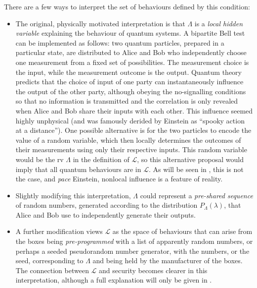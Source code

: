 \documentclass[10pt, a4paper]{article}
\numberwithin{equation}{section} %
\theoremstyle{definition}
\theoremstyle{plain}
\newcommand{\?}{\mathrel{?}} %
\newcommand{\Ls}{\mathcal{L}}
\begin{document}
    There are a few ways to interpret the set of behaviours defined by this condition:
    \begin{itemize}
      \item The original, physically motivated interpretation is that \(\Lambda\) is a \emph{local hidden variable} explaining the behaviour of quantum systems. A bipartite Bell test can be implemented as follows: two quantum particles, prepared in a particular state, are distributed to Alice and Bob who independently choose one measurement from a fixed set of possibilities. The measurement choice is the input, while the measurement outcome is the output. Quantum theory predicts that the choice of input of one party can instantaneously influence the output of the other party, although obeying the no-signalling conditions so that no information is transmitted and the correlation is only revealed when Alice and Bob share their inputs with each other. This influence seemed highly unphysical (and was famously derided by Einstein as ``spooky action at a distance''). One possible alternative is for the two particles to encode the value of a random variable, which then locally determines the outcomes of their measurements using only their respective inputs. This random variable would be the rv \(\Lambda\) in the definition of \(\Ls\), so this alternative proposal would imply that all quantum behaviours are in \(\Ls\). As will be seen in , this is not the case, and \emph{pace} Einstein, nonlocal influence is a feature of reality.
      \item Slightly modifying this interpretation, \(\Lambda\) could represent a \emph{pre-shared sequence} of random numbers, generated according to the distribution \(P_{\Lambda}(\lambda)\), that Alice and Bob use to independently generate their outputs.
      \item A further modification views \(\Ls\) as the space of behaviours that can arise from the boxes being \emph{pre-programmed} with a list of apparently random numbers, or perhaps a seeded pseudorandom number generator, with the numbers, or the seed, corresponding to \(\Lambda\) and being held by the manufacturer of the boxes. The connection between \(\Ls\) and security becomes clearer in this interpretation, although a full explanation will only be given in .
    \end{itemize}
\end{document}

